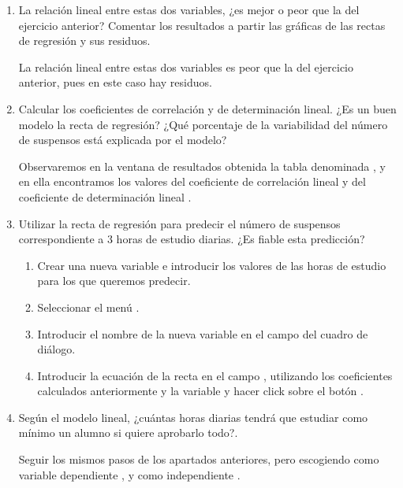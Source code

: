 \begin{enumerate}[leftmargin=*]
\begin{enumerate}
\item La relación lineal entre estas dos variables, ¿es mejor o peor 
que la del ejercicio anterior? Comentar los resultados a partir las 
gráficas de las rectas de regresión y sus residuos.
\begin{indicacion}
La relación lineal entre estas dos variables es peor que la del 
ejercicio anterior, pues en este caso hay residuos.
\end{indicacion}

\item Calcular los coeficientes de correlación y de determinación lineal. 
¿Es un buen modelo la recta de regresión? ¿Qué porcentaje de la 
variabilidad del número de suspensos está explicada por el modelo?
\begin{indicacion}
Observaremos en la ventana de resultados obtenida la tabla denominada 
, y en ella encontramos los valores del 
coeficiente de correlación lineal  y del coeficiente de 
determinación lineal .
\end{indicacion}

\item Utilizar la recta de regresión para predecir el número de suspensos 
correspondiente a 3 horas de estudio diarias. ¿Es fiable esta predicción?
\begin{indicacion}
\begin{enumerate}
\item Crear una nueva variable  e introducir 
los valores de las horas de estudio para los que queremos predecir.
\item Seleccionar el menú .
\item Introducir el nombre de la nueva variable 
 en el campo 
del cuadro de diálogo.
\item Introducir la ecuación de la recta en el campo 
, utilizando los coeficientes calculados
anteriormente y la variable  y hacer click 
sobre el botón .
\end{enumerate}
\end{indicacion}

\item Según el modelo lineal, ¿cuántas horas diarias tendrá que estudiar 
como mínimo un alumno si quiere aprobarlo todo?.
\begin{indicacion}
Seguir los mismos pasos de los apartados anteriores, pero escogiendo 
como variable dependiente ,
y como independiente .
\end{indicacion}
\end{enumerate}


\end{enumerate}

